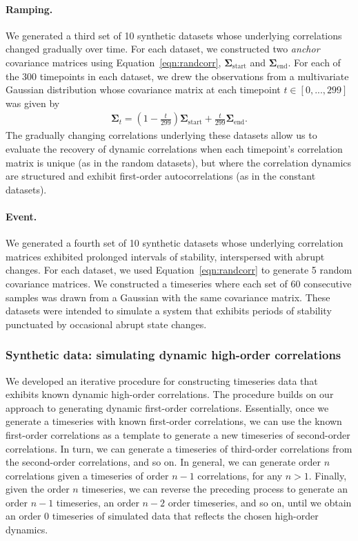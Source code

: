 \documentclass[english]{article}
\begin{document}
  \paragraph*{Ramping.}  We generated a third set of 10 synthetic
  datasets whose underlying correlations changed gradually over time.
  For each dataset, we constructed two \textit{anchor} covariance
  matrices using Equation~\ref{eqn:randcorr},
  $\mathbf{\Sigma}_{\mathrm{start}}$ and
  $\mathbf{\Sigma}_{\mathrm{end}}$.  For each of the 300 timepoints in
  each dataset, we drew the observations from a multivariate Gaussian
  distribution whose covariance matrix at each timepoint $t \in
  \left[0, ..., 299\right]$ was given by
  \begin{align}
    \mathbf{\Sigma}_t = \left( 1 - \frac{t}{299} \right)
    \mathbf{\Sigma}_{\mathrm{start}} + \frac{t}{299}\mathbf{\Sigma}_{\mathrm{end}}.
  \end{align}
The gradually changing correlations underlying these datasets allow us
to evaluate the recovery of dynamic correlations when each timepoint's
correlation matrix is unique (as in the random datasets), but where
the correlation dynamics are structured and exhibit first-order
autocorrelations (as in the constant datasets).
  
\paragraph*{Event.} We generated a fourth set of 10 synthetic datasets
whose underlying correlation matrices exhibited prolonged intervals of
stability, interspersed with abrupt changes.  For each dataset, we
used Equation~\ref{eqn:randcorr} to generate 5 random covariance
matrices.  We constructed a timeseries where each set of 60 consecutive samples
was drawn from a Gaussian with the same covariance matrix.  These
datasets were intended to simulate a system that exhibits periods of
stability punctuated by occasional abrupt state changes.

\subsubsection*{Synthetic data: simulating dynamic high-order
  correlations}

We developed an iterative procedure for constructing timeseries data
that exhibits known dynamic high-order correlations.  The procedure
builds on our approach to generating dynamic first-order correlations.
Essentially, once we generate a timeseries with known first-order
correlations, we can use the known first-order correlations as a
template to generate a new timeseries of second-order correlations.
In turn, we can generate a timeseries of third-order correlations from
the second-order correlations, and so on.  In general, we can generate
order $n$ correlations given a timeseries of order $n - 1$ correlations,
for any $n > 1$.  Finally, given the order $n$ timeseries, we can
reverse the preceding process to generate an order $n - 1$ timeseries, an
order $n - 2$ order timeseries, and so on, until we obtain an order 0
timeseries of simulated data that reflects the chosen high-order dynamics.
\end{document}
